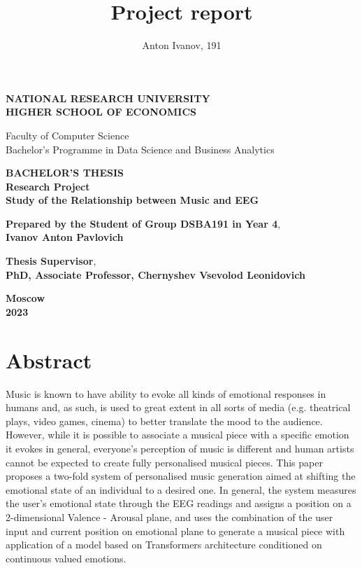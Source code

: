 \documentclass[14pt]{extreport}
\title{Project report}
\author{Anton Ivanov, 191}
\begin{document}
\thispagestyle{empty}
 \onehalfspacing %
\setlength{\parindent}{0pt}

\begin{center}
    \textbf{NATIONAL RESEARCH UNIVERSITY} \\
    \textbf{HIGHER SCHOOL OF ECONOMICS}

    Faculty of Computer Science \\
    Bachelor's Programme in Data Science and Business Analytics
    \vfill

    \textbf{\Large BACHELOR'S THESIS} \\
    \vspace{3mm}
    {\large \textbf{Research Project}} \\
    \vspace{2mm}
    \textbf{\large Study of the Relationship between Music and EEG}
    \vfill
\end{center}
\vspace{3cm}
{\textbf{\large Prepared by the Student of Group DSBA191 in Year 4},} \\
\textbf{\large Ivanov Anton Pavlovich} \newline

{\textbf{\large Thesis Supervisor}, \\
\textbf{\large PhD, Associate Professor, Chernyshev Vsevolod Leonidovich} }

\vspace{3cm}

\begin{center}
    \textbf{\large Moscow} \\ 
    \textbf{\large 2023}
\end{center}
\vfill

\clearpage
{} 
\tableofcontents
\clearpage
\clearpage

\setlength{\parskip}{0.5 em}


\section*{Abstract}
\par Music is known to have ability to evoke all kinds of emotional responses in humans and, as such, is used to great extent in all sorts of media (e.g. theatrical plays, video games, cinema) to better translate the mood to the audience. However, while it is possible to associate a musical piece with a specific emotion it evokes in general, everyone's perception of music is different and human artists cannot be expected to create fully personalised musical pieces. This paper proposes a two-fold system of personalised music generation aimed at shifting the emotional state of an individual to a desired one. In general, the system measures the user's emotional state through the EEG readings and assigns a position on a 2-dimensional Valence - Arousal plane, and uses the combination of the user input and current position on emotional plane to generate a musical piece with application of a model based on Transformers architecture conditioned on continuous valued emotions.
\end{document}
